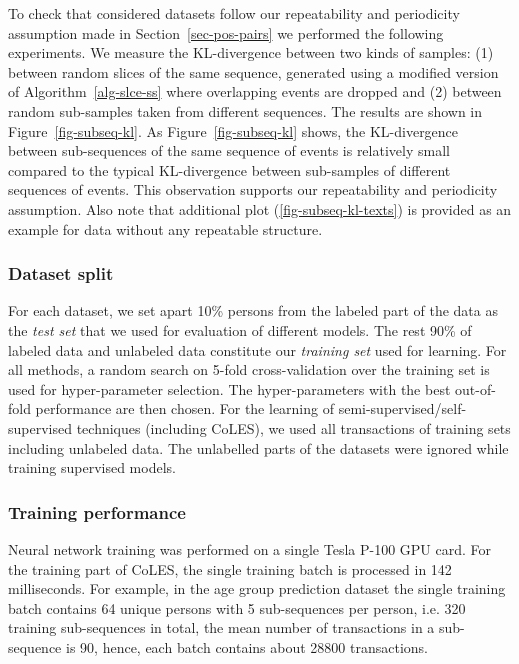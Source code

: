 \documentclass[sigconf, anonymous]{acmart}
\begin{document}
To check that considered datasets follow our repeatability and periodicity assumption made in Section~\ref{sec-pos-pairs}
we performed the following experiments. We measure the KL-divergence between two kinds of samples: (1) between random slices of the same sequence, generated using a modified version of Algorithm~\ref{alg-slce-ss} where overlapping events are dropped and (2) between random sub-samples taken from different sequences. The results are shown in Figure~\ref{fig-subseq-kl}. As Figure~\ref{fig-subseq-kl} shows, the KL-divergence between sub-sequences of the same sequence of events is relatively small compared to the typical KL-divergence between sub-samples of different sequences of events. This observation supports our repeatability and periodicity assumption.
Also note that additional plot (\ref{fig-subseq-kl-texts}) is provided as an example for data without any repeatable structure.

\subsubsection{Dataset split}

For each dataset, we set apart 10\% persons from the labeled part of the data as the \textit{test set} that we used for evaluation of different models. The rest 90\% of labeled data and unlabeled data constitute our \textit{training set} used for learning. For all methods, a random search on 5-fold cross-validation over the training set is used for hyper-parameter selection. The hyper-parameters with the best out-of-fold performance are then chosen.
For the learning of semi-supervised/self-supervised techniques (including CoLES), we used all transactions of training sets including unlabeled data. The unlabelled parts of the datasets were ignored while training supervised models.

\subsubsection{Training performance}

Neural network training was performed on a single Tesla P-100 GPU card. For the training part of CoLES, the single training batch is processed in 142 milliseconds. For example, in the age group prediction dataset the single training batch contains 64 unique persons with 5 sub-sequences per person, i.e. 320 training sub-sequences in total, the mean number of transactions in a sub-sequence is 90, hence, each batch contains about 28800 transactions.
\end{document}
